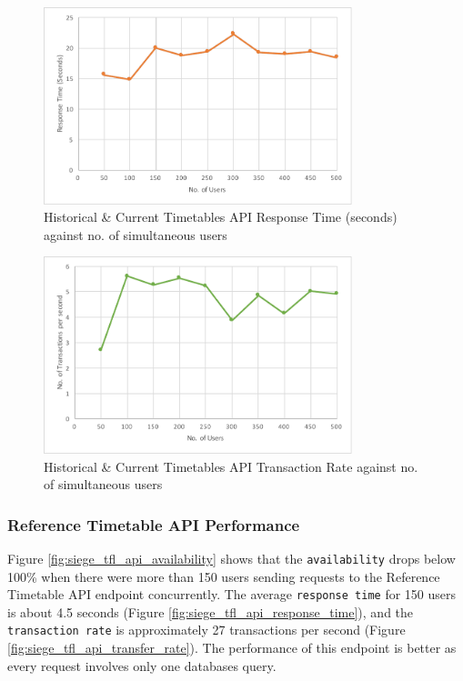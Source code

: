 \begin{figure}
\centering
\includegraphics[width=0.8\textwidth]{figures/siege_predictions_api_response_time_against_users.pdf}
\caption{\label{fig:siege_pre_api_response_time} Historical \& Current Timetables API Response Time (seconds) against no. of simultaneous users}
\end{figure}

\begin{figure}
\centering
\includegraphics[width=0.8\textwidth]{figures/siege_predictions_api_transfer_rate_against_users.pdf}
\caption{\label{fig:siege_pre_api_transfer_rate} Historical \& Current Timetables API Transaction Rate against no. of simultaneous users}
\end{figure}

\subsubsection{Reference Timetable API Performance}
\par Figure \ref{fig:siege_tfl_api_availability} shows that the \texttt{availability} drops below 100\% when there were more than 150 users sending requests to the Reference Timetable API endpoint concurrently. The average \texttt{response time} for 150 users is about 4.5 seconds (Figure \ref{fig:siege_tfl_api_response_time}), and the \texttt{transaction rate} is approximately 27 transactions per second (Figure \ref{fig:siege_tfl_api_transfer_rate}). The performance of this endpoint is better as every request involves only one databases query.

